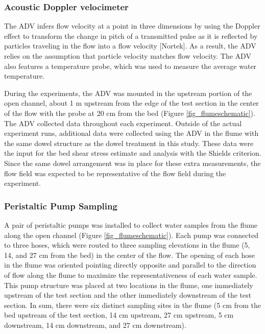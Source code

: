 \documentclass[12pt]{article}
\begin{document}
\subsubsection{Acoustic Doppler velocimeter}

The ADV infers flow velocity at a point in three dimensions by using the Doppler effect to transform the change in pitch of a transmitted pulse as it is reflected by particles traveling in the flow into a flow velocity [Nortek]. As a result, the ADV relies on the assumption that particle velocity matches flow velocity. The ADV also features a temperature probe, which was used to measure the average water temperature.

During the experiments, the ADV was mounted in the upstream portion of the open channel, about 1 m upstream from the edge of the test section in the center of the flow with the probe at 20 cm from the bed (Figure \ref{fig_flumeschematic}). The ADV collected data throughout each experiment. Outside of the actual experiment runs, additional data were collected using the ADV in the flume with the same dowel structure as the dowel treatment in this study. These data were the input for the bed shear stress estimate and analysis with the Shields criterion. Since the same dowel arrangement was in place for these extra measurements, the flow field was expected to be representative of the flow field during the experiment.

\subsubsection{Peristaltic Pump Sampling}

A pair of peristaltic pumps was installed to collect water samples from the flume along the open channel (Figure \ref{fig_flumeschematic}). Each pump was connected to three hoses, which were routed to three sampling elevations in the flume (5, 14, and 27 cm from the bed) in the center of the flow. The opening of each hose in the flume was oriented pointing directly opposite and parallel to the direction of flow along the flume to maximize the representativeness of each water sample. This pump structure was placed at two locations in the flume, one immediately upstream of the test section and the other immediately downstream of the test section. In sum, there were six distinct sampling sites in the flume (5 cm from the bed upstream of the test section, 14 cm upstream, 27 cm upstream, 5 cm downstream, 14 cm downstream, and 27 cm downstream).
\end{document}
